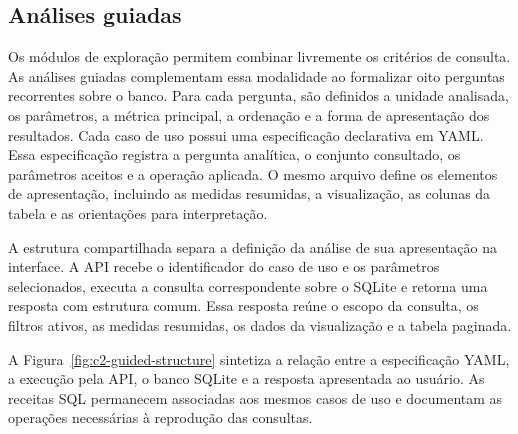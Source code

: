 \subsection{Análises guiadas}

Os módulos de exploração permitem combinar livremente os critérios de
consulta. As análises guiadas complementam essa modalidade ao formalizar oito
perguntas recorrentes sobre o banco. Para cada pergunta, são definidos a
unidade analisada, os parâmetros, a métrica principal, a ordenação e a forma
de apresentação dos resultados. Cada caso de uso possui uma especificação declarativa em YAML. Essa
especificação registra a pergunta analítica, o conjunto consultado, os
parâmetros aceitos e a operação aplicada. O mesmo arquivo define os elementos
de apresentação, incluindo as medidas resumidas, a visualização, as colunas da
tabela e as orientações para interpretação.

A estrutura compartilhada separa a definição da análise de sua apresentação
na interface. A API recebe o identificador do caso de uso e os parâmetros
selecionados, executa a consulta correspondente sobre o SQLite e retorna uma
resposta com estrutura comum. Essa resposta reúne o escopo da consulta, os
filtros ativos, as medidas resumidas, os dados da visualização e a tabela
paginada.

A Figura~\ref{fig:c2-guided-structure} sintetiza a relação entre a
especificação YAML, a execução pela API, o banco SQLite e a resposta
apresentada ao usuário. As receitas SQL permanecem associadas aos mesmos casos
de uso e documentam as operações necessárias à reprodução das consultas.

